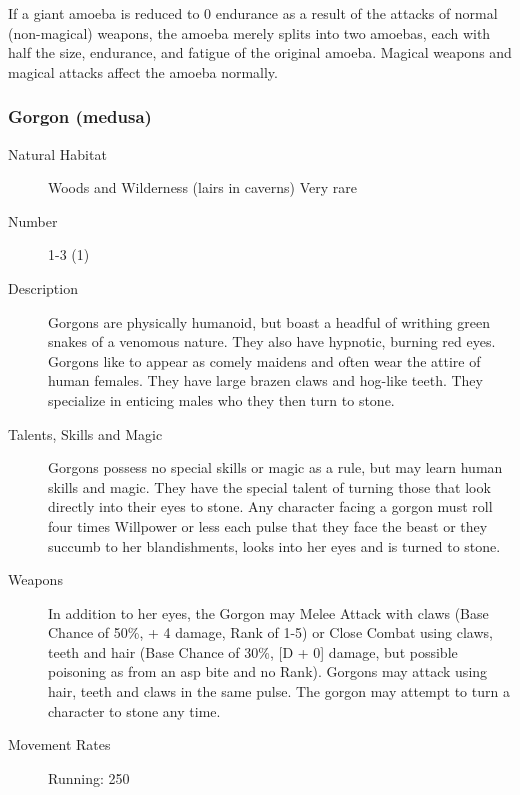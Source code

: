 \begin{multicols*}{2}
\begin{description}
\setlength\itemsep{0pt}

\item[Comments] If a giant amoeba is reduced to 0 endurance as a result of
the attacks of normal (non-magical) weapons, the amoeba merely splits
into two amoebas, each with half the size, endurance, and fatigue of
the original amoeba. Magical weapons and magical attacks affect the
amoeba normally.

\end{description}

\subsubsection{Gorgon (medusa)}

\begin{description}
\item[Natural Habitat] Woods and Wilderness (lairs in caverns) Very rare 

\item[Number]  1-3 (1)

\item[Description] Gorgons are physically humanoid, but boast a headful of
writhing green snakes of a venomous nature. They also have hypnotic,
burning red eyes. Gorgons like to appear as comely maidens and often
wear the attire of human females.  They have large brazen claws and
hog-like teeth. They specialize in enticing males who they then turn
to stone.

\item[Talents, Skills and Magic] Gorgons possess no special skills or magic as a rule, but
may learn human skills and magic. They have the special talent of
turning those that look directly into their eyes to stone. Any
character facing a gorgon must roll four times Willpower or less each
pulse that they face the beast or they succumb to her blandishments,
looks into her eyes and is turned to stone.

\item[Weapons] In addition to her eyes, the Gorgon may Melee Attack with
claws (Base Chance of 50\%, + 4 damage, Rank of 1-5) or Close Combat
using claws, teeth and hair (Base Chance of 30\%, [D + 0] damage, but
possible poisoning as from an asp bite and no Rank). Gorgons may
attack using hair, teeth and claws in the same pulse. The gorgon may
attempt to turn a character to stone any time.


\item[Movement Rates] Running: 250


\end{description}
\end{multicols*}
